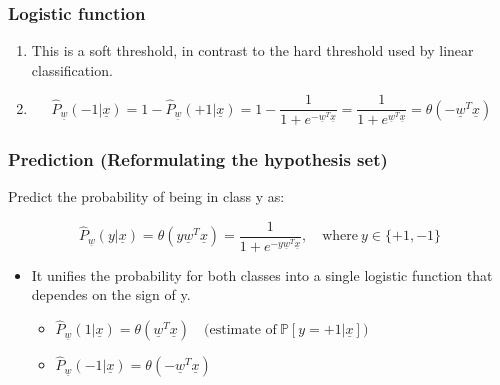     \subsubsection{Logistic function}
    \begin{intuition}
        \begin{enumerate}
            \item This is a soft threshold, in contrast to the hard threshold used by linear classification.
            
            \item 
            \[
            \hat{P}_{\underline{w}}(-1 | \underline{x}) = 1 - \hat{P}_{\underline{w}}(+1 | \underline{x}) = 1 - \frac{1}{1 + e^{-\underline{w}^T \underline{x}}} = \frac{1}{1 + e^{\underline{w}^T \underline{x}}} = \theta(-\underline{w}^T \underline{x})
            \]            
        \end{enumerate}        
    \end{intuition}

    \subsubsection{Prediction (Reformulating the hypothesis set)}
    \begin{definition}
        Predict the probability of being in class y as:

        \begin{equation}
            \hat{P}_{\underline{w}}(y | \underline{x}) = \theta(y \underline{w}^T \underline{x}) = \frac{1}{1 + e^{-y \underline{w}^T \underline{x}}}, \quad \text{where} \ y \in \{+1, -1\}        
        \end{equation}
    
        \begin{itemize}
            \item It unifies the probability for both classes into a single logistic function that dependes on the sign of y. 
            \begin{itemize}
                \item $\hat{P}_{\underline{w}}(1 | \underline{x}) = \theta(\underline{w}^T \underline{x}) \quad \text{(estimate of} \ \mathbb{P}[y = +1 | \underline{x}] \text{)}$
                \item $\hat{P}_{\underline{w}}(-1 | \underline{x}) = \theta(-\underline{w}^T \underline{x})$
            \end{itemize}
        \end{itemize}
    \end{definition}

